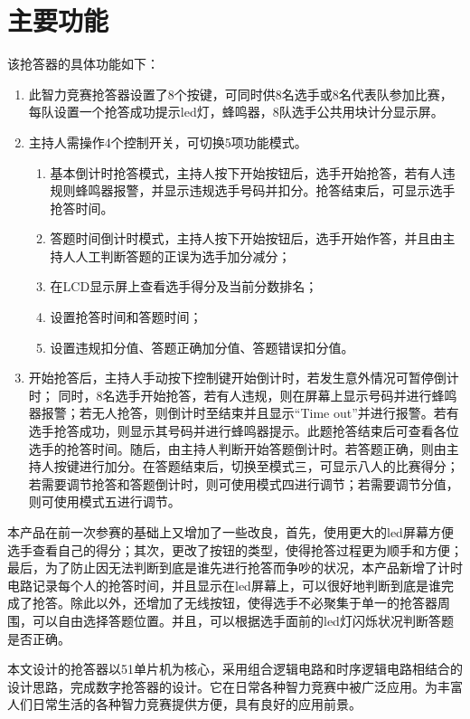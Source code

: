 \documentclass[12pt]{article}
\begin{document}
\section{主要功能}
该抢答器的具体功能如下：
\begin{enumerate}
  \item 此智力竞赛抢答器设置了8个按键，可同时供8名选手或8名代表队参加比赛，每队设置一个抢答成功提示led灯，蜂鸣器，8队选手公共用块计分显示屏。
  \item 主持人需操作4个控制开关，可切换5项功能模式。
  \begin{enumerate}[模式1:]
    \item 基本倒计时抢答模式，主持人按下开始按钮后，选手开始抢答，若有人违规则蜂鸣器报警，并显示违规选手号码并扣分。抢答结束后，可显示选手抢答时间。
   \item  答题时间倒计时模式，主持人按下开始按钮后，选手开始作答，并且由主持人人工判断答题的正误为选手加分减分；
\item 在LCD显示屏上查看选手得分及当前分数排名；
\item 设置抢答时间和答题时间；
\item 设置违规扣分值、答题正确加分值、答题错误扣分值。
  \end{enumerate}
  \item 开始抢答后，主持人手动按下控制键开始倒计时，若发生意外情况可暂停倒计时； 同时，8名选手开始抢答，若有人违规，则在屏幕上显示号码并进行蜂鸣器报警；若无人抢答，则倒计时至结束并且显示“Time out”并进行报警。若有选手抢答成功，则显示其号码并进行蜂鸣器提示。此题抢答结束后可查看各位选手的抢答时间。随后，由主持人判断开始答题倒计时。若答题正确，则由主持人按键进行加分。在答题结束后，切换至模式三，可显示八人的比赛得分；若需要调节抢答和答题倒计时，则可使用模式四进行调节；若需要调节分值，则可使用模式五进行调节。
\end{enumerate}

本产品在前一次参赛的基础上又增加了一些改良，首先，使用更大的led屏幕方便选手查看自己的得分；其次，更改了按钮的类型，使得抢答过程更为顺手和方便；最后，为了防止因无法判断到底是谁先进行抢答而争吵的状况，本产品新增了计时电路记录每个人的抢答时间，并且显示在led屏幕上，可以很好地判断到底是谁完成了抢答。除此以外，还增加了无线按钮，使得选手不必聚集于单一的抢答器周围，可以自由选择答题位置。并且，可以根据选手面前的led灯闪烁状况判断答题是否正确。

本文设计的抢答器以51单片机为核心，采用组合逻辑电路和时序逻辑电路相结合的设计思路，完成数字抢答器的设计。它在日常各种智力竞赛中被广泛应用。为丰富人们日常生活的各种智力竞赛提供方便，具有良好的应用前景。
\end{document}
